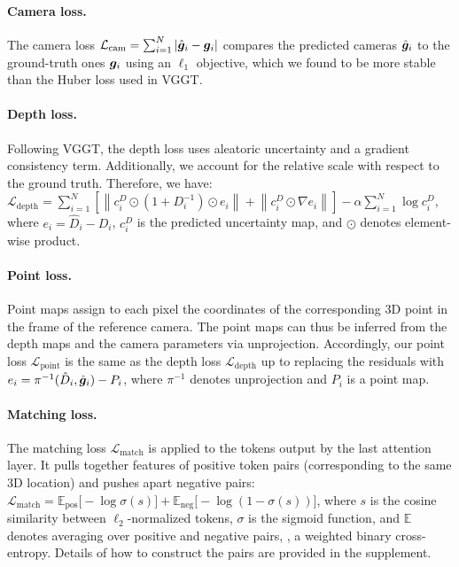 \paragraph{Camera loss.}

The camera loss
$
\mathcal{L}_\text{cam} =
\sum_{i=1}^N \left| \hat{\boldsymbol{g}}_i - \boldsymbol{g}_i \right|
$
compares the predicted cameras $\hat{\boldsymbol{g}}_i$ to the ground-truth ones $\boldsymbol{g}_i$ using an $\ell_1$ objective, which we found to be more stable than the Huber loss used in VGGT\@.

\paragraph{Depth loss.}

Following VGGT, the depth loss uses aleatoric uncertainty and a gradient consistency term.
Additionally, we account for the relative scale with respect to the ground truth.
Therefore, we have:
$
\mathcal{L}_{\text{depth}} =
\sum_{i=1}^{N}
\left[
\left \|
c_i^{D} \odot \left( 1 + D_i^{-1} \right) \odot e_i \right \|
+
\left \| c_i^{D} \odot \nabla e_i \right \|
\right] - \alpha \sum_{i=1}^{N} \log c_i^{D}
$, where $e_i = \hat{D}_i - D_i$,  $c_i^{D}$ is the predicted uncertainty map, and $\odot$ denotes element-wise product.

\paragraph{Point loss.}

Point maps assign to each pixel the coordinates of the corresponding 3D point in the frame of the reference camera.
The point maps can thus be inferred from the depth maps and the camera parameters via unprojection.
Accordingly, our point loss $\mathcal{L}_{\text{point}}$ is the same as the depth loss $\mathcal{L}_{\text{depth}}$ up to replacing the residuals with
$
e_i = \pi^{-1}(\hat{D}_i, \hat{\boldsymbol{g}}_i) - P_i
$,
where $\pi^{-1}$ denotes unprojection and $P_i$ is a point map.

\paragraph{Matching loss.}

The matching loss $\mathcal{L}_{\text{match}}$ is applied to the tokens output by the last attention layer.
It pulls together features of positive token pairs (corresponding to the same 3D location) and pushes apart negative pairs:
$
\mathcal{L}_{\text{match}} = \mathbb{E}_{\text{pos}}\!\big[-\log \sigma(s)\big] + \mathbb{E}_{\text{neg}}\!\big[-\log(1-\sigma(s))\big]
$,
where $s$ is the cosine similarity between $\ell_2$-normalized tokens, $\sigma$ is the sigmoid function, and $\mathbb{E}$ denotes averaging over positive and negative pairs, \ie, a weighted binary cross-entropy.
Details of how to construct the pairs are provided in the supplement.


